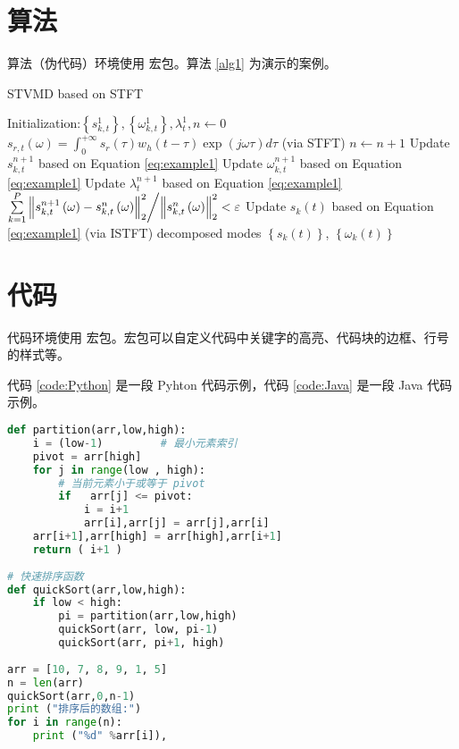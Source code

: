 \documentclass[report, twoside, UTF8, AutoFakeBold = 1, AutoFakeSlant, zihao = -4]{config}
\begin{document}
\section{算法}

算法（伪代码）环境使用  宏包。算法 \ref{alg1} 为演示的案例。

\begin{algorithm}
	\caption{STVMD based on STFT}
	\label{alg1}
	\begin{algorithmic}[1]
		\STATE Initialization:$\left\{ {s_{k,t}^1} \right\},\left\{ {\omega _{k,t}^1} \right\},\lambda _t^1,n \leftarrow 0$
		\STATE  ${s_{r,t}}\left( \omega  \right) = \int_0^{ + \infty } {{s_r}\left( \tau  \right){w_h}\left( {t - \tau } \right)} \exp \left( {j\omega \tau } \right)d\tau $   (via STFT)
		\REPEAT
		\STATE $n \leftarrow n + 1$
		\STATE Update $ s_{k,t}^{n + 1} $ based on Equation \eqref{eq:example1}
		\STATE Update $\omega _{k,t}^{n + 1}$ based on Equation \eqref{eq:example1}
		\STATE Update $\lambda _t^{n + 1} $ based on Equation \eqref{eq:example1}
		\UNTIL $\sum\limits_{k=1}^P  {{{\left\| {s_{k,t}^{n + 1}\left( \omega  \right) - s_{k,t}^n\left( \omega  \right)} \right\|_2^2} \mathord{\left/
					{\vphantom {{\left\| {s_{k,t}^{n + 1}\left( \omega  \right) - s_{k,t}^n\left( \omega  \right)} \right\|_2^2} {\left\| {s_{k,t}^n\left( \omega  \right)} \right\|_2^2}}} \right.
					\kern-\nulldelimiterspace} {\left\| {s_{k,t}^n\left( \omega  \right)} \right\|_2^2}}}  < \varepsilon $  
		\STATE   Update ${s_k}\left( t \right)$ based on Equation \eqref{eq:example1}  (via ISTFT)
		\ENSURE  decomposed modes $ \left\{ {{s_k}\left( t \right)} \right\}$, $\left\{ {{\omega _k}\left( t \right)} \right\}$
	\end{algorithmic}  
\end{algorithm}

\section{代码}

代码环境使用  宏包。宏包可以自定义代码中关键字的高亮、代码块的边框、行号的样式等。

代码 \ref{code:Python} 是一段 Pyhton 代码示例，代码 \ref{code:Java} 是一段 Java 代码示例。
\begin{lstlisting}[label=code:Python, language=Python, caption=Python代码测试]
def partition(arr,low,high): 
    i = (low-1)         # 最小元素索引
    pivot = arr[high]     
    for j in range(low , high): 
        # 当前元素小于或等于 pivot 
        if   arr[j] <= pivot: 
            i = i+1 
            arr[i],arr[j] = arr[j],arr[i] 
    arr[i+1],arr[high] = arr[high],arr[i+1] 
    return ( i+1 ) 
  
# 快速排序函数
def quickSort(arr,low,high): 
    if low < high: 
        pi = partition(arr,low,high) 
        quickSort(arr, low, pi-1) 
        quickSort(arr, pi+1, high) 
  
arr = [10, 7, 8, 9, 1, 5] 
n = len(arr) 
quickSort(arr,0,n-1) 
print ("排序后的数组:") 
for i in range(n): 
    print ("%d" %arr[i]),
\end{lstlisting}
\end{document}
